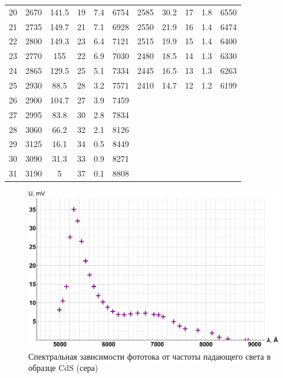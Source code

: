 \documentclass[12pt]{kiarticle} %
\begin{document}
\begin{table}[h]
\begin{center}
\begin{tabular}{|c|ccccc|ccccc|}
				20 & 2670 & 141.5 & 19 & 7.4 & 6754 & 2585 & 30.2 & 17 & 1.8 & 6550 \\
				21 & 2735 & 149.7 & 21 & 7.1 & 6928 & 2550 & 21.9 & 16 & 1.4 & 6474 \\
				22 & 2800 & 149.3 & 23 & 6.4 & 7121 & 2515 & 19.9 & 15 & 1.4 & 6400 \\
				23 & 2770 & 155 & 22 & 6.9 & 7030 & 2480 & 18.5 & 14 & 1.3 & 6330 \\
				24 & 2865 & 129.5 & 25 & 5.1 & 7334 & 2445 & 16.5 & 13 & 1.3 & 6263 \\
				25 & 2930 & 88.5 & 28 & 3.2 & 7571 & 2410 & 14.7 & 12 & 1.2 & 6199 \\
				26 & 2900 & 104.7 & 27 & 3.9 & 7459 & \text{} & \text{} & \text{} & \text{} & \text{} \\
				27 & 2995 & 83.8 & 30 & 2.8 & 7834 & \text{} & \text{} & \text{} & \text{} & \text{} \\
				28 & 3060 & 66.2 & 32 & 2.1 & 8126 & \text{} & \text{} & \text{} & \text{} & \text{} \\
				29 & 3125 & 16.1 & 34 & 0.5 & 8449 & \text{} & \text{} & \text{} & \text{} & \text{} \\
				30 & 3090 & 31.3 & 33 & 0.9 & 8271 & \text{} & \text{} & \text{} & \text{} & \text{} \\
				31 & 3190 & 5 & 37 & 0.1 & 8808 & \text{} & \text{} & \text{} & \text{} & \text{} \\
				\hline
			\end{tabular}
		\end{center}
		\label{table_5}
	\end{table}

	\begin{figure}[h]

	\includegraphics[scale=0.47]{s.pdf}
	\caption{Спектральная зависимости фототока от частоты падающего света в образце CdS (сера)}
	\label{graf_s}
\end{figure}
\end{document}
